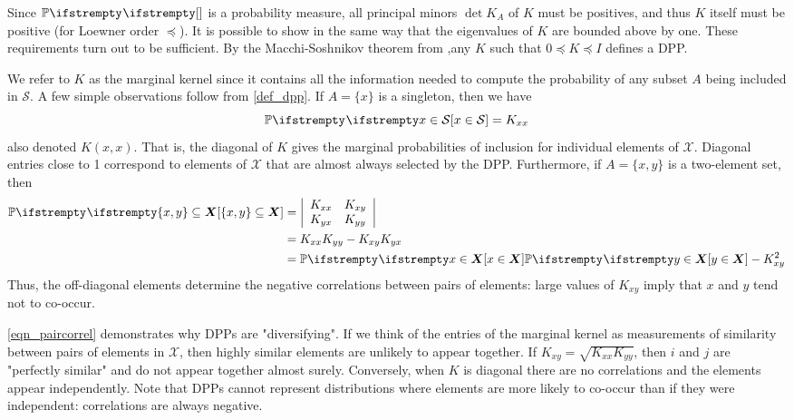 Since $\PP{}{}$ is a probability measure, all principal minors $\operatorname{det}K_A$ of $K$ must be positives, and thus $K$ itself must be positive (for Loewner order $\preceq$). It is possible to show in the same way that the eigenvalues of $K$ are bounded above by one. These requirements turn out to be sufficient. By the Macchi-Soshnikov theorem from \cite{macchi1975dpp},any $K$ such that $0 \preceq K \preceq I$ defines a DPP.

We refer to $K$ as the marginal kernel since it contains all the information needed to compute the probability of any subset $A$ being included in $\mathcal{S}$. A few simple observations follow from \cref{def_dpp}. If $A=\{x\}$ is a singleton, then we have
\begin{equation}
    \label{eqn__marginal}
	\PP{}{x \in \mathcal{S}}=K_{x x}
\end{equation}
also denoted $K(x,x)$. That is, the diagonal of $K$ gives the marginal probabilities of inclusion for individual elements of $\mathcal{X}$. Diagonal entries close to 1 correspond to elements of $\mathcal{X}$ that are almost always selected by the DPP. Furthermore, if $A=\{x, y\}$ is a two-element set, then
\begin{equation}
    \label{eqn_paircorrel}
	\begin{aligned}
        \PP{}{\{x, y\} \subseteq \boldsymbol{X}} &=\left|\begin{array}{ll}
	K_{x x} & K_{x y} \\
	K_{y x} & K_{y y}
	\end{array}\right| \\
	&=K_{x x} K_{y y}-K_{x y} K_{y x} \\
	&=\PP{}{x \in \boldsymbol{X}} \PP{}{y \in \boldsymbol{X}}-K_{x y}^2
	\end{aligned}
\end{equation}
Thus, the off-diagonal elements determine the negative correlations between pairs of elements: large values of $K_{x y}$ imply that $x$ and $y$ tend not to co-occur.

\cref{eqn_paircorrel} demonstrates why DPPs are "diversifying". If we think of the entries of the marginal kernel as measurements of similarity between pairs of elements in $\mathcal{X}$, then highly similar elements are unlikely to appear together. If $K_{x y}=\sqrt{K_{x x} K_{y y}}$, then $i$ and $j$ are "perfectly similar" and do not appear together almost surely. Conversely, when $K$ is diagonal there are no correlations and the elements appear independently. Note that DPPs cannot represent distributions where elements are more likely to co-occur than if they were independent: correlations are always negative.





